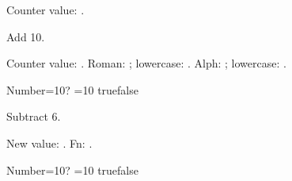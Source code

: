 \documentclass{article}
\begin{document}
 Counter value: \themycounter. 

Add 10. \addtocounter{mycounter}{10} Counter value: \themycounter. Roman: ; lowercase: . Alph: ; lowercase: . 

Number=10? \ifnum\value{mycounter}=10 true\else false\fi 

Subtract 6. \addtocounter{mycounter}{-6} New value: . Fn: . 

Number=10? \ifnum\value{mycounter}=10 true\else false\fi 

  
\end{document}
